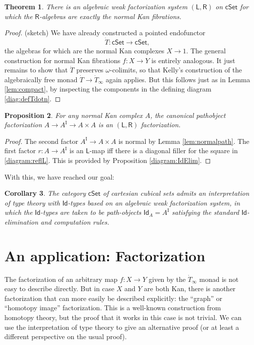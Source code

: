 \documentclass[12pt]{article}
\newcommand{\cSet}{\ensuremath{\mathsf{cSet}}}
\newcommand{\LL}{\ensuremath{\mathsf{L}}}
\newcommand{\RR}{\ensuremath{\mathsf{R}}}
\newcommand{\I}{\ensuremath{\mathrm{I}}}
\newcommand{\Id}{\ensuremath{\mathsf{Id}}}
\newcommand{\id}[1]{\Id_{#1}}
\newtheorem{theorem}{Theorem}
\newtheorem{proposition}[theorem]{Proposition}
\newtheorem{corollary}[theorem]{Corollary}
\theoremstyle{remark}
\theoremstyle{definition}
\begin{document}
\begin{theorem}\label{thm:AWFS2}
There is an algebraic weak factorization system $(\LL,\RR)$ on $\cSet$ for which the $\RR$-algebras are exactly the normal Kan fibrations. \end{theorem}

\begin{proof}(sketch)
We have already constructed a pointed endofunctor $$\dot{T} :\cSet\to\cSet,$$ the algebras for which are the normal Kan complexes $X\to 1$.   The general construction for normal Kan fibrations $f:X\to Y$ is entirely analogous.  It just remains to show that $\dot{T}$ preserves $\omega$-colimits, so that Kelly's construction of the algebraically free monad $\dot{T}\to \dot{T}_\infty$ again applies. But this follows just as in Lemma \ref{lem:compact}, by inspecting the components in the defining diagram \eqref{diag:defTdotn}.
\end{proof}

\begin{proposition}
For any normal Kan complex $A$, the canonical pathobject factorization $A\to A^\I\to A\times A$ is an $(\LL,\RR)$ factorization.
\end{proposition}

\begin{proof}
The second factor $A^\I\to A\times A$ is normal by Lemma \ref{lem:normalpath}. The first factor $r:A\to A^\I$ is an $\LL$-map iff there is a diagonal filler for the square in \eqref{diagram:reflL}.  This is provided by Proposition \ref{diagram:IdElim}.
\end{proof}

With this, we have reached our goal: 
\begin{corollary}
The category $\cSet$ of cartesian cubical sets admits an interpretation of type theory with \Id-types based on an algebraic weak factorization system, in which the \Id-types are taken to be path-objects $\id{A} = A^\I$ satisfying the standard \Id-elimination and computation rules.  
\end{corollary}

\section{An application: Factorization}

The factorization of an arbitrary map $f:X\to Y$ given by the $\dot{T}_\infty$ monad is not easy to describe directly.  But in case $X$ and $Y$ are both Kan, there is another factorization that can more easily be described explicitly: the ``graph'' or ``homotopy image'' factorization. This is a well-known construction from homotopy theory, but the proof that it works in this case is not trivial.  We can use the interpretation of type theory to give an alternative proof (or at least a different perspective on the usual proof).
\end{document}
